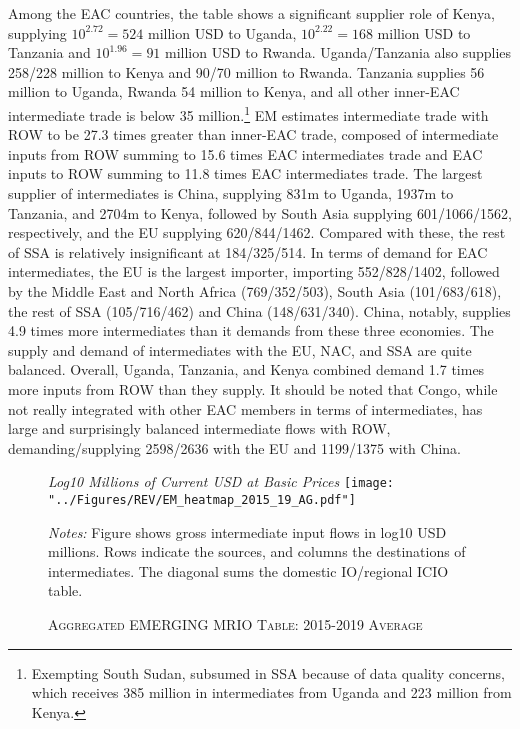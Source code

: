\documentclass[a4paper]{article}
\begin{document}
Among the EAC countries, the table shows a significant supplier role of Kenya, supplying $10^{2.72} = 524$ million USD to Uganda, $10^{2.22} = 168$ million USD to Tanzania and  $10^{1.96} = 91$ million USD to Rwanda. Uganda/Tanzania also supplies 258/228 million to Kenya and 90/70 million to Rwanda. Tanzania supplies 56 million to Uganda, Rwanda 54 million to Kenya, and all other inner-EAC intermediate trade is below 35 million.\footnote{Exempting South Sudan, subsumed in SSA because of data quality concerns, which receives 385 million in intermediates from Uganda and 223 million from Kenya.} EM estimates intermediate trade with ROW to be 27.3 times greater than inner-EAC trade, composed of intermediate inputs from ROW summing to 15.6 times EAC intermediates trade and EAC inputs to ROW summing to 11.8 times EAC intermediates trade. The largest supplier of intermediates is China, supplying 831m to Uganda, 1937m to Tanzania, and 2704m to Kenya, followed by South Asia supplying 601/1066/1562, respectively, and the EU supplying 620/844/1462. Compared with these, the rest of SSA is relatively insignificant at 184/325/514. In terms of demand for EAC intermediates, the EU is the largest importer, importing 552/828/1402, followed by the Middle East and North Africa (769/352/503), South Asia (101/683/618), the rest of SSA (105/716/462) and China (148/631/340). China, notably, supplies 4.9 times more intermediates than it demands from these three economies. The supply and demand of intermediates with the EU, NAC, and SSA are quite balanced. Overall, Uganda, Tanzania, and Kenya combined demand 1.7 times more inputs from ROW than they supply. It should be noted that Congo, while not really integrated with other EAC members in terms of intermediates, has large and surprisingly balanced intermediate flows with ROW, demanding/supplying 2598/2636 with the EU and 1199/1375 with China. 

\begin{figure}[h!] 
\centering
\caption{\label{fig:wld}\textsc{Aggregated EMERGING MRIO Table: 2015-2019 Average}}
\small{\textit{Log10 Millions of Current USD at Basic Prices}}
\texttt{[image: "../Figures/REV/EM\_heatmap\_2015\_19\_AG.pdf"]} \\ 
\raggedright
\scriptsize
\emph{Notes:} Figure shows gross intermediate input flows in log10 USD millions. Rows indicate the sources, and columns the destinations of intermediates. The diagonal sums the domestic IO/regional ICIO table. 
\end{figure}
\FloatBarrier
\end{document}
